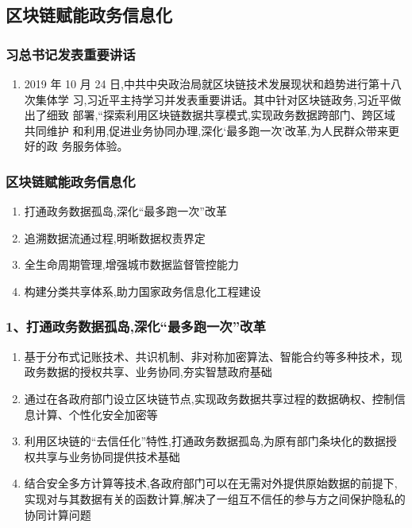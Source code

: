 \documentclass[11pt]{beamer}
\begin{document}
\subsection{区块链赋能政务信息化}
\begin{frame}
	\frametitle{习总书记发表重要讲话}
	\begin{enumerate}
		\item 2019 年
		10 月 24 日,中共中央政治局就区块链技术发展现状和趋势进行第十八次集体学
		习,习近平主持学习并发表重要讲话。其中针对区块链政务,习近平做出了细致
		部署,“探索利用区块链数据共享模式,实现政务数据跨部门、跨区域共同维护
		和利用,促进业务协同办理,深化‘最多跑一次’改革,为人民群众带来更好的政
		务服务体验。
	\end{enumerate}
\end{frame}

\begin{frame}
\frametitle{区块链赋能政务信息化}
\begin{enumerate}
	\item 打通政务数据孤岛,深化“最多跑一次”改革
	\item 追溯数据流通过程,明晰数据权责界定
	\item 全生命周期管理,增强城市数据监督管控能力
	\item 构建分类共享体系,助力国家政务信息化工程建设
\end{enumerate}
\end{frame}

\begin{frame}
	\frametitle{1、打通政务数据孤岛,深化“最多跑一次”改革}
	\begin{enumerate}
		\item 基于分布式记账技术、共识机制、非对称加密算法、智能合约等多种技术，现政务数据的授权共享、业务协同,夯实智慧政府基础
		\item 通过在各政府部门设立区块链节点,实现政务数据共享过程的数据确权、控制信息计算、个性化安全加密等
		\item 利用区块链的“去信任化”特性,打通政务数据孤岛,为原有部门条块化的数据授权共享与业务协同提供技术基础
		\item 结合安全多方计算等技术,各政府部门可以在无需对外提供原始数据的前提下,实现对与其数据有关的函数计算,解决了一组互不信任的参与方之间保护隐私的协同计算问题
	\end{enumerate}
\end{frame}
\end{document}
